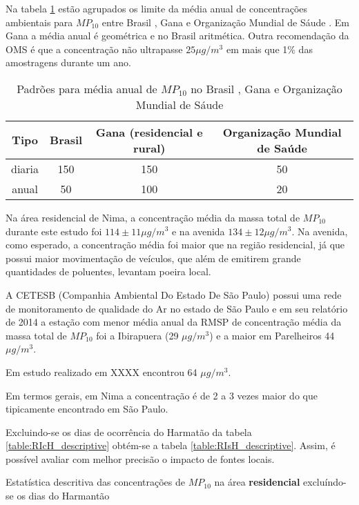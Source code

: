 Na tabela \ref{table:pm10standards} estão agrupados os limite da média anual de 
concentrações ambientais para $MP_{10}$ entre Brasil \citep{conama1990}, 
Gana \citep{epa2015} e Organização Mundial de Sáude \citep{who}. 
Em Gana a média anual é geométrica e no Brasil aritmética.
Outra recomendação da OMS é que a concentração não ultrapasse $25 \mu g/m^3$ 
em mais que 1\% das amostragens durante um ano. 

\begin{table}[H]
  \centering
      \begin{tabular}{cccc}
     \hline
   Tipo & Brasil & Gana (residencial e rural) & Organização Mundial de Saúde \\
     \hline
   diaria & 150 & 150 &  50 \\
     anual &  50 & 100 &  20 \\
      \hline
  \end{tabular}
  \caption{Padrões para média anual de $MP_{10}$ no Brasil \citep{conama1990}, 
           Gana \citep{epa2015} e 
           Organização Mundial de Sáude \citep{who}
           \label{table:pm10standards}}
\end{table}

Na área residencial de Nima, a concentração média da massa total de $MP_{10}$ 
durante este estudo foi $114\pm 11 \mu g / m^3$ e na avenida 
$134\pm 12 \mu g / m^3$. Na avenida, como esperado, a concentração média 
foi maior que na região residencial, já que possui maior movimentação de 
veículos, que além de emitirem grande quantidades de poluentes, levantam 
poeira local. 

A CETESB (Companhia Ambiental Do Estado De São Paulo) possui uma rede de 
monitoramento de qualidade do Ar no estado de São Paulo e em seu relatório 
de 2014 \citep{cetesb2014} a estação com menor média anual da RMSP 
de concentração média da massa total de $MP_{10}$ foi a Ibirapuera 
(29 $\mu g / m^3$) e a maior em Parelheiros 44 $\mu g / m^3$.  

Em estudo realizado em XXXX \cite{souza2014} encontrou 64 $\mu g / m^3$.

Em termos gerais, em Nima a concentração é de 2 a 3 vezes maior do que 
tipicamente encontrado em São Paulo. 

Excluindo-se os dias de ocorrência do Harmatão da tabela 
\ref{table:RIcH_descriptive} obtém-se a tabela \ref{table:RIsH_descriptive}.
Assim, é possível avaliar com melhor precisão o impacto de fontes locais.  

\begin{table}[H]
  \centering
    
  \caption{Estatística descritiva das concentrações de  $MP_{10}$ na área 
           \textbf{residencial} excluíndo-se os dias do Harmantão
            \label{table:RIsH_descriptive}}
\end{table}


